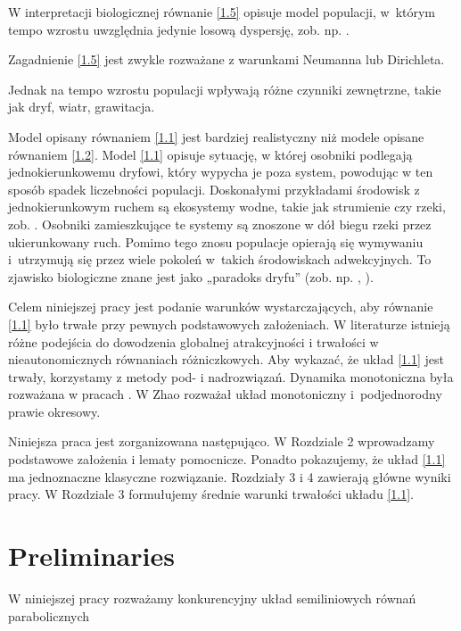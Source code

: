 	W interpretacji biologicznej równanie \eqref{1.5} opisuje model populacji, w~którym tempo wzrostu uwzględnia jedynie losową dyspersję, zob. np.
	 \cite{Chafee,Hale,Rocha}.
	
	Zagadnienie \eqref{1.5} jest zwykle rozważane z warunkami Neumanna lub Dirichleta.
	
	Jednak na tempo wzrostu populacji wpływają różne czynniki zewnętrzne, takie jak dryf, wiatr, grawitacja.
	
	Model opisany równaniem \eqref{1.1} jest bardziej realistyczny niż modele opisane równaniem \eqref{1.2}.  
	Model \eqref{1.1} opisuje sytuację, w której osobniki podlegają jednokierunkowemu dryfowi, który wypycha je poza system, powodując w ten sposób spadek liczebności populacji. Doskonałymi przykładami środowisk z jednokierunkowym ruchem są ekosystemy wodne, takie jak strumienie czy rzeki, zob.  \cite{Lou,Speirs}. Osobniki zamieszkujące te systemy są znoszone w dół biegu rzeki przez ukierunkowany ruch. Pomimo tego znosu populacje opierają się wymywaniu i~utrzymują się przez wiele pokoleń w~takich środowiskach adwekcyjnych. To zjawisko biologiczne znane jest jako „paradoks dryfu” (zob. np. \cite{Anholt,Hershey,Huisman,Hsu,Muller1,Muller2,Pachepsky,Shigesada,Waters,Waters1}, ).
	
	Celem niniejszej pracy jest podanie warunków wystarczających, aby równanie \eqref{1.1} było trwałe przy pewnych podstawowych założeniach. W literaturze istnieją różne podejścia do dowodzenia globalnej atrakcyjności i trwałości w nieautonomicznych równaniach różniczkowych.
	Aby wykazać, że układ \eqref{1.1} jest trwały, korzystamy z metody pod- i nadrozwiązań.  Dynamika monotoniczna była rozważana w pracach  \cite{periodic,Hirsch,Yi,Smith}. W \cite{Zhao} Zhao rozważał układ monotoniczny i~podjednorodny prawie okresowy. 
	\vspace{2mm}
	
	Niniejsza praca jest zorganizowana następująco.
	W Rozdziale 2 wprowadzamy podstawowe założenia i lematy pomocnicze. Ponadto pokazujemy, że układ \eqref{1.1} ma jednoznaczne klasyczne rozwiązanie.
	Rozdziały 3 i 4 zawierają główne wyniki pracy. W Rozdziale 3 formułujemy średnie warunki trwałości układu \eqref{1.1}.
	
	\section{Preliminaries}
	
	W niniejszej pracy rozważamy konkurencyjny układ semiliniowych równań parabolicznych
	
